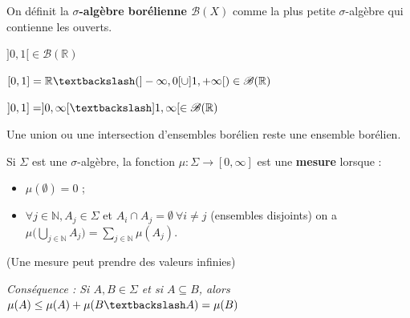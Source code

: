 \begin{definition}
    On définit la \textbf{$\sigma$-algèbre borélienne $\mathscr{B}(X)$} comme la plus petite $\sigma$-algèbre qui contienne les ouverts.
\end{definition}
\begin{example}
    $]0,1[\in\mathscr{B}(\mathbb{R})$
\end{example}
\begin{example}
    $[0,1] = \mathbb{R}\textbackslash (]-\infty,0[\cup]1,+\infty[)\in\mathscr{B}(\mathbb{R})$
\end{example}
\begin{example}
    $]0,1] = ]0,\infty[\textbackslash ]1,\infty[\in\mathscr{B}(\mathbb{R})$
\end{example}

\begin{remark}
    Une union ou une intersection d'ensembles borélien reste une ensemble borélien.
\end{remark}

\begin{definition}
    Si $\Sigma$ est une $\sigma$-algèbre, la fonction $\mu:\Sigma\to[0,\infty]$ est une \textbf{mesure} lorsque :
    \begin{itemize}
        \item $\mu(\emptyset)=0$ ;
        \item $\forall j\in\mathbb{N}, A_j\in \Sigma$ et $A_i\cap A_j = \emptyset\ \forall i\neq j$ (ensembles disjoints) on a $\mu\Big(\bigcup\limits_{j\in\mathbb{N}}A_j\Big) = \sum\limits_{j\in\mathbb{N}}\mu(A_j).$
    \end{itemize}
    (Une mesure peut prendre des valeurs infinies)
\end{definition}
\textit{Conséquence : Si $A,B\in\Sigma$ et si $A\subseteq B$, alors $\mu(A)\leq\mu(A)+\mu(B\textbackslash A)=\mu(B)$}

